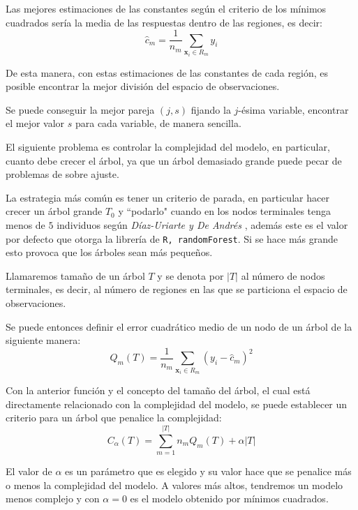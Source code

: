\noindent Las mejores estimaciones de las constantes según el criterio de los mínimos cuadrados sería la media de las respuestas dentro de las regiones, es decir: 
\begin{equation}
\hat{c}_m=\dfrac{1}{n_m}\sum_{\textbf{x}_i\in R_m} y_i
\end{equation}

\noindent De esta manera, con estas estimaciones de las constantes de cada región, es posible encontrar la mejor división del espacio de observaciones. 

\noindent Se puede conseguir la mejor pareja $(j,s)$ fijando la $j$-ésima variable, encontrar el mejor valor $s$ para cada variable, de manera sencilla. 

\noindent El siguiente problema es controlar la complejidad del modelo, en particular, cuanto debe crecer el árbol, ya que un árbol demasiado grande  puede pecar de problemas de sobre ajuste. 

\noindent La estrategia más común es tener un criterio de parada, en particular hacer crecer un árbol grande $T_0$ y ``podarlo" cuando en los nodos terminales tenga menos de $5$ individuos según \textit{Díaz-Uriarte y De Andrés} \cite{Diaz 2006}, además este es el valor por defecto que otorga la librería de  \texttt{R, randomForest}. Si se hace más grande esto provoca que los árboles sean más pequeños. 

\begin{defi}
Llamaremos tamaño de un árbol $T$ y se denota por $|T|$ al número de nodos terminales, es decir, al número de regiones en las que se particiona el espacio de observaciones.
\end{defi}

\noindent Se puede entonces definir el error cuadrático medio de un nodo de un árbol de la siguiente manera:
\begin{equation}
Q_m(T)= \dfrac{1}{n_m}\sum_{\textbf{x}_i\in R_m}(y_i- \hat{c}_m)^2
\end{equation}

\noindent Con la anterior función y el concepto del tamaño del árbol, el cual está directamente relacionado con la complejidad del modelo, se puede establecer un criterio para un árbol que penalice la complejidad:
\begin{equation} \label{Eq Cost-Complexity}
C_{\alpha}(T)=\sum_{m=1}^{|T|}n_m Q_m(T) + \alpha|T|
\end{equation}

\noindent El valor de $\alpha$ es un parámetro que es elegido y su valor hace que se penalice más o menos la complejidad del modelo. A valores más altos, tendremos un modelo menos complejo y con $\alpha = 0$ es el modelo obtenido por mínimos cuadrados.

